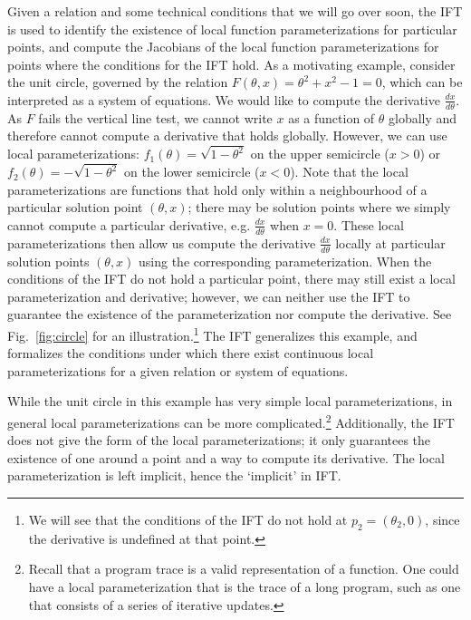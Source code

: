 \documentclass[11pt]{article}
\begin{document}
Given a relation and some technical conditions that we will go over soon,
the IFT is used to identify the existence of local
function parameterizations for particular points,
and compute the Jacobians of the local function parameterizations for points
where the conditions for the IFT hold.
As a motivating example, consider the unit circle,
governed by the relation $F(\theta,x) = \theta^2 + x^2 - 1 = 0$,
which can be interpreted as a system of equations.
We would like to compute the derivative $\frac{dx}{d\theta}$.
As $F$ fails the vertical line test, we cannot write $x$ as a function of $\theta$ globally
and therefore cannot compute a derivative that holds globally.
However, we can use local parameterizations: $f_1(\theta) = \sqrt{1-\theta^2}$ on the upper semicircle ($x>0$)
or $f_2(\theta) = -\sqrt{1-\theta^2}$ on the lower semicircle ($x<0$).
Note that the local parameterizations are functions that hold
only within a neighbourhood of a particular solution point $(\theta,x)$;
there may be solution points where we simply cannot compute a particular derivative,
e.g. $\frac{dx}{d\theta}$ when $x=0$.
These local parameterizations then allow us compute the derivative $\frac{dx}{d\theta}$
locally at particular solution points $(\theta,x)$ using the corresponding parameterization.
When the conditions of the IFT do not hold a particular point,
there may still exist a local parameterization and derivative;
however, we can neither use the IFT to guarantee the existence of the parameterization
nor compute the derivative.
See Fig.~\ref{fig:circle} for an illustration.\footnote{
    We will see that the conditions of the IFT do not hold at $p_2 = (\theta_2, 0)$,
    since the derivative is undefined at that point.
}
The IFT generalizes this example, and formalizes the conditions under which there exist
continuous local parameterizations for a given relation or system of equations.

While the unit circle in this example has very simple local parameterizations,
in general local parameterizations can be more complicated.\footnote{
Recall that a program trace is a valid representation of a function.
One could have a local parameterization that is the trace of a long program,
such as one that consists of a series of iterative updates.
}
Additionally, the IFT does not give the form of the local parameterizations;
it only guarantees the existence of one around a point and a way to compute its derivative.
The local parameterization is left implicit, hence the `implicit' in IFT.
\end{document}
